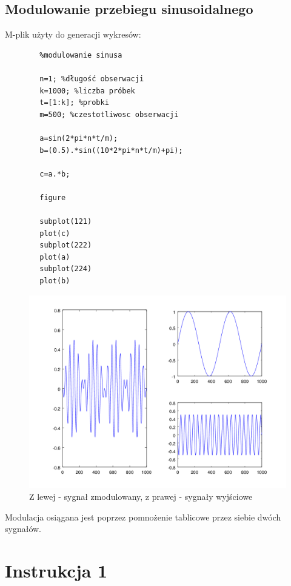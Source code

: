 \documentclass[12pt,titlepage]{report}
\begin{document}
\subsection{Modulowanie przebiegu sinusoidalnego}
M-plik użyty do generacji wykresów:
\begin{multicols}{2}
	{
		\tiny
		\begin{verbatim}
		%modulowanie sinusa
		
		n=1; %długość obserwacji
		k=1000; %liczba próbek
		t=[1:k]; %probki
		m=500; %czestotliwosc obserwacji
		
		a=sin(2*pi*n*t/m);
		b=(0.5).*sin((10*2*pi*n*t/m)+pi);
		
		c=a.*b;
		
		figure
		
		subplot(121)
		plot(c)
		subplot(222)
		plot(a)
		subplot(224)
		plot(b)
		\end{verbatim}
	}
\end{multicols}

\begin{figure}[!h]
	\centering
	\includegraphics[scale=0.4]{../cw07_output}
	\caption{Z lewej - sygnał zmodulowany, z prawej - sygnały wyjściowe}
\end{figure}
Modulacja osiągana jest poprzez pomnożenie tablicowe przez siebie dwóch sygnałów.
\newpage

\section{Instrukcja 1}
\end{document}
